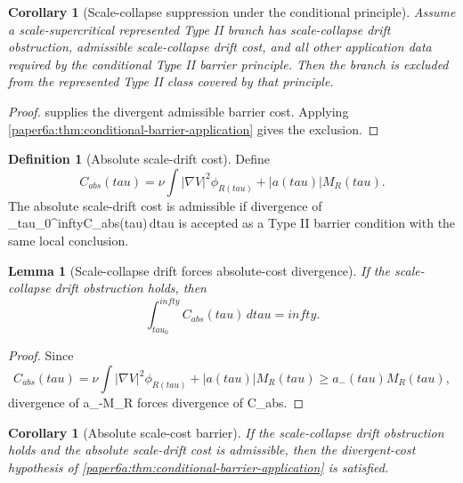 \documentclass[11pt]{amsart}
\def\({}%
\def\){}%
\def\mathfrak#1{#1}%
\def\mathrm#1{#1}%
\def\tau{tau}%
\def\infty{infty}%
\theoremstyle{plain}
\newtheorem{lemma}[theorem]{Lemma}
\newtheorem{corollary}[theorem]{Corollary}
\theoremstyle{definition}
\newtheorem{definition}[theorem]{Definition}
\theoremstyle{remark}
\begin{document}
\begin{corollary}[Scale-collapse suppression under the conditional principle]
\label{paper6a:cor:scale-collapse-suppression}
Assume a scale-supercritical represented Type II branch has scale-collapse
drift obstruction, admissible scale-collapse drift cost, and all other
application data required by the conditional Type II barrier principle.  Then
the branch is excluded from the represented Type II class covered by that
principle.
\end{corollary}

\begin{proof}
 supplies the divergent
admissible barrier cost.  Applying
\cref{paper6a:thm:conditional-barrier-application} gives the exclusion.
\end{proof}

\begin{definition}[Absolute scale-drift cost]\label{paper6a:def:absolute-scale-cost}
Define
\[
  \mathfrak C_{\mathrm{abs}}(\tau)
  =
  \nu\int|\nabla V|^2\phi_{R(\tau)}
  +|a(\tau)|M_R(\tau).
\]
The absolute scale-drift cost is admissible if divergence of
\(\int_{\tau_0}^{\infty}\mathfrak C_{\mathrm{abs}}(\tau)\,d\tau\) is accepted
as a Type II barrier condition with the same local conclusion.
\end{definition}

\begin{lemma}[Scale-collapse drift forces absolute-cost divergence]
\label{paper6a:lem:scale-drift-absolute}
If the scale-collapse drift obstruction holds, then
\[
  \int_{\tau_0}^{\infty}\mathfrak C_{\mathrm{abs}}(\tau)\,d\tau=\infty .
\]
\end{lemma}

\begin{proof}
Since
\[
  \mathfrak C_{\mathrm{abs}}(\tau)
  =
  \nu\int|\nabla V|^2\phi_{R(\tau)}
  +|a(\tau)|M_R(\tau)
  \ge a_-(\tau)M_R(\tau),
\]
divergence of \(\int a_-M_R\) forces divergence of
\(\int\mathfrak C_{\mathrm{abs}}\).
\end{proof}

\begin{corollary}[Absolute scale-cost barrier]\label{paper6a:cor:absolute-scale-cost-barrier}
If the scale-collapse drift obstruction holds and the absolute scale-drift
cost is admissible, then the divergent-cost hypothesis of
\cref{paper6a:thm:conditional-barrier-application} is satisfied.
\end{corollary}
\end{document}
